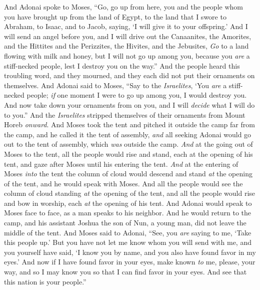 \begin{biblechapter} %
 And Adonai spoke to Moses, “Go, go up from here, you and the people whom you have brought up from the land of Egypt, to the land that I swore to Abraham, to Isaac, and to Jacob, saying, ‘I will give it to your offspring.’
\verse And I will send an angel before you, and I will drive out the Canaanites, the Amorites, and the Hittites and the Perizzites, the Hivites, and the Jebusites,
\verse \textit{Go} to a land flowing with milk and honey, but I will not go up among you, because you \textit{are} a stiff-necked people, lest I destroy you on the way.”
\verse And the people heard this troubling word, and they mourned, and they each did not put their ornaments on themselves.
\verse And Adonai said to Moses, “Say to the \textit{Israelites}, ‘You \textit{are} a stiff-necked people; \textit{if} one moment I were to go up among you, I would destroy you. And now take down your ornaments from on you, and I will \textit{decide} what I will do to you.”
\verse And the \textit{Israelites} stripped themselves of their ornaments from Mount Horeb \textit{onward}.
 And Moses took the tent and pitched it outside the camp far from the camp, and he called it the tent of assembly, \textit{and} all seeking Adonai would go out to the tent of assembly, which \textit{was} outside the camp.
\verse \textit{And} at the going out of Moses to the tent, all the people would rise and stand, each at the opening of his tent, and gaze after Moses until his entering the tent.
\verse \textit{And} at the entering of Moses \textit{into} the tent the column of cloud would descend and stand \textit{at} the opening of the tent, and he would speak with Moses.
\verse And all the people would see the column of cloud standing \textit{at} the opening of the tent, and all the people would rise and bow in worship, each \textit{at} the opening of his tent.
\verse And Adonai would speak to Moses face to face, as a man speaks to his neighbor. And he would return to the camp, and his assistant Joshua the son of Nun, a young man, did not leave the middle of the tent.
 And Moses said to Adonai, “See, you \textit{are} saying to me, ‘Take this people up.’ But you have not let me know whom you will send with me, and you yourself have said, ‘I know you by name, and you also have found favor in my eyes.’
\verse And now if I have found favor in your eyes, make known \textit{to} me, please, your way, and so I may know you so that I can find favor in your eyes. And see that this nation is your people.”

\end{biblechapter}
